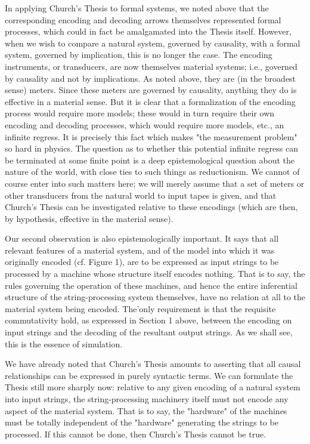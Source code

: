 \documentclass[a4paper,12pt]{article}
\begin{document}
In applying Church's Thesis to formal systems, we noted above that the
corresponding encoding and decoding arrows themselves represented formal processes, which could in fact be amalgamated into
the Thesis itself. However, when we wish to compare a natural system, governed by causality, with a formal system, governed by
implication, this is no longer the case. The encoding instruments, or transducers, are now themselves material systems;
i.e., governed by causality and not by implications. As noted above, they are (in the broadest sense) meters. Since these meters are governed by
causality, anything they do is effective in a material sense. But it is clear that a formalization of the encoding process would require more models;
these would in turn require their own encoding and decoding processes, which would require more models, etc., an infinite regress.
It is precisely this fact which makes "the measurement problem" so hard in physics. The question as to whether this potential infinite regress
can be terminated at some finite point is a deep epistemological question about the nature of the world, with close ties to such things as
reductionism. We cannot of course enter into such matters here; we will merely assume that a set of meters or other transducers
from the natural world to input tapes is given, and that Church's Thesis can be investigated relative to these encodings
(which are then, by hypothesis, effective in the material sense).

Our second observation is also epistemologically important. It says that
all relevant features of a material system, and of the model into which it
was originally encoded (cf. Figure 1), are to be expressed as input strings to
be processed by a machine whose structure itself encodes nothing. That is to
say, the rules governing the operation of these machines, and hence the entire
inferential structure of the string-processing system themselves, have no
relation at all to the material system being encoded. The'only requirement
is that the requisite commutativity hold, as expressed in Section 1 above,
between the encoding on input strings and the decoding of the resultant
output strings. As we shall see, this is the essence of simulation.

We have already noted that Church's Thesis amounts to asserting that
all causal relationships can be expressed in purely syntactic terms. We can
formulate the Thesis still more sharply now: relative to any given encoding
of a natural system into input strings, the string-processing machinery itself
must not encode any aspect of the material system.  That is to say, the
"hardware" of the machines must be totally independent of the "hardware"
generating the strings to be processed. If this cannot be done, then Church's
Thesis cannot be true.
\end{document}
